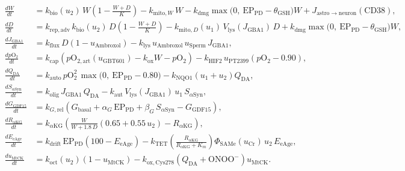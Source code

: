 \documentclass[11pt]{article}
\theoremstyle{plain}
\begin{document}
\begin{align}
  \frac{dW}{dt} &= k_{\mathrm{bio}}(u_2)\,W\left(1 - \frac{W+D}{K}\right) - k_{\mathrm{mito},W}\,W - k_{\mathrm{dmg}}\max\!\big(0,\ \mathrm{EP}_{\mathrm{PD}} - \theta_{\mathrm{GSH}}\big)W + J_{\mathrm{astro}\to\mathrm{neuron}}(\mathrm{CD38}), \label{eq:app_pd_W}\\
  \frac{dD}{dt} &= k_{\mathrm{rep,adv}}\,k_{\mathrm{bio}}(u_2)\,D\left(1 - \frac{W+D}{K}\right) - k_{\mathrm{mito},D}(u_1)\,V_{\mathrm{lys}}(J_{\mathrm{GBA1}})\,D + k_{\mathrm{dmg}}\max\!\big(0,\ \mathrm{EP}_{\mathrm{PD}} - \theta_{\mathrm{GSH}}\big)W, \label{eq:app_pd_D}\\
  \frac{dJ_{\mathrm{GBA1}}}{dt} &= k_{\mathrm{flux}}\,D\left(1 - u_{\mathrm{Ambroxol}}\right) - k_{\mathrm{lys}}\,u_{\mathrm{Ambroxol}}\,u_{\mathrm{Sperm}}\,J_{\mathrm{GBA1}}, \label{eq:app_pd_GBA1}\\
  \frac{dp\mathrm{O}_2}{dt} &= k_{\mathrm{cap}}\left(p\mathrm{O}_{2,\mathrm{art}}(u_{\mathrm{GBT601}}) - k_{\mathrm{ox}}W - p\mathrm{O}_2\right) - k_{\mathrm{HIF2}}\,u_{\mathrm{PT2399}}\left(p\mathrm{O}_2 - 0.90\right), \label{eq:app_pd_pO2}\\
  \frac{dQ_{\mathrm{DA}}}{dt} &= k_{\mathrm{auto}}\,p\mathrm{O}_2^2\,\max\!\big(0,\ \mathrm{EP}_{\mathrm{PD}} - 0.80\big) - k_{\mathrm{NQO1}}(u_1 + u_2)Q_{\mathrm{DA}}, \label{eq:app_pd_QDA}\\
  \frac{dS_{\alpha\mathrm{Syn}}}{dt} &= k_{\mathrm{olig}}\,J_{\mathrm{GBA1}}\,Q_{\mathrm{DA}} - k_{\mathrm{aut}}\,V_{\mathrm{lys}}(J_{\mathrm{GBA1}})\,u_1\,S_{\alpha\mathrm{Syn}}, \label{eq:app_pd_aSyn}\\
  \frac{dG_{\mathrm{GDF15}}}{dt} &= k_{G,\mathrm{rel}}\left(G_{\mathrm{basal}} + \alpha_G\,\mathrm{EP}_{\mathrm{PD}} + \beta_G\,S_{\alpha\mathrm{Syn}} - G_{\mathrm{GDF15}}\right), \label{eq:app_pd_GDF15}\\
  \frac{dR_{\alpha\mathrm{KG}}}{dt} &= k_{\alpha\mathrm{KG}}\left(\frac{W}{W + 1.8\,D}\left(0.65 + 0.55\,u_2\right) - R_{\alpha\mathrm{KG}}\right), \label{eq:app_pd_aKG}\\
  \frac{dE_{\mathrm{eAge}}}{dt} &= k_{\mathrm{drift}}\,\mathrm{EP}_{\mathrm{PD}}\left(100 - E_{\mathrm{eAge}}\right) - k_{\mathrm{TET}}\left(\frac{R_{\alpha\mathrm{KG}}}{R_{\alpha\mathrm{KG}} + K_m}\right)\Phi_{\mathrm{SAMe}}(u_{\mathrm{Cr}})\,u_2\,E_{\mathrm{eAge}}, \label{eq:app_pd_eAge}\\
  \frac{du_{\mathrm{MtCK}}}{dt} &= k_{\mathrm{oct}}(u_2)\left(1 - u_{\mathrm{MtCK}}\right) - k_{\mathrm{ox,Cys278}}\left(Q_{\mathrm{DA}} + \mathrm{ONOO}^-\right)u_{\mathrm{MtCK}}. \label{eq:app_pd_uMtCK}
\end{align}
\end{document}
